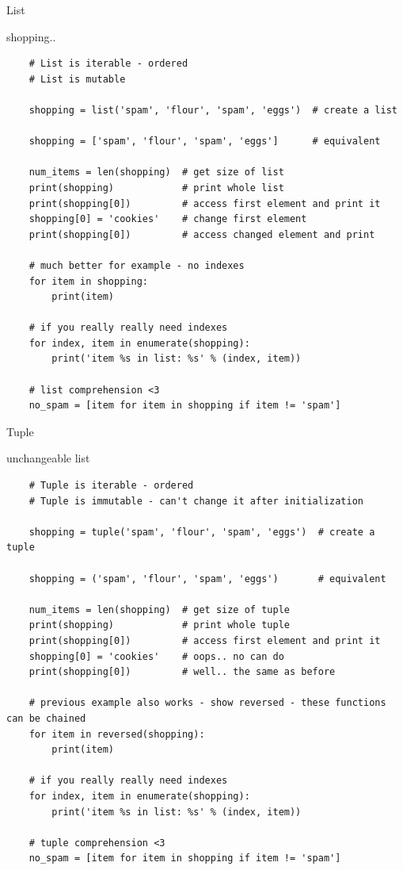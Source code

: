 \documentclass{bredelebeamer}
\begin{document}
\begin{frame}[fragile]{List}
  \begin{exampleblock}{shopping..}
    \begin{lstlisting}
    # List is iterable - ordered
    # List is mutable
    
    shopping = list('spam', 'flour', 'spam', 'eggs')  # create a list
    
    shopping = ['spam', 'flour', 'spam', 'eggs']      # equivalent
    
    num_items = len(shopping)  # get size of list
    print(shopping)            # print whole list
    print(shopping[0])         # access first element and print it
    shopping[0] = 'cookies'    # change first element
    print(shopping[0])         # access changed element and print
    
    # much better for example - no indexes
    for item in shopping:
        print(item)
        
    # if you really really need indexes
    for index, item in enumerate(shopping):
        print('item %s in list: %s' % (index, item))
        
    # list comprehension <3
    no_spam = [item for item in shopping if item != 'spam']
    \end{lstlisting}
  \end{exampleblock}
\end{frame}

\begin{frame}[fragile]{Tuple}
  \begin{exampleblock}{unchangeable list}
    \begin{lstlisting}
    # Tuple is iterable - ordered
    # Tuple is immutable - can't change it after initialization
    
    shopping = tuple('spam', 'flour', 'spam', 'eggs')  # create a tuple
     
    shopping = ('spam', 'flour', 'spam', 'eggs')       # equivalent
    
    num_items = len(shopping)  # get size of tuple
    print(shopping)            # print whole tuple
    print(shopping[0])         # access first element and print it
    shopping[0] = 'cookies'    # oops.. no can do
    print(shopping[0])         # well.. the same as before
    
    # previous example also works - show reversed - these functions can be chained
    for item in reversed(shopping):
        print(item)
        
    # if you really really need indexes
    for index, item in enumerate(shopping):
        print('item %s in list: %s' % (index, item))
        
    # tuple comprehension <3
    no_spam = [item for item in shopping if item != 'spam']
    \end{lstlisting}
  \end{exampleblock}
\end{frame}
\end{document}
